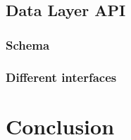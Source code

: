 \subsection{Data Layer API}
\subsubsection{Schema}
\subsubsection{Different interfaces}

\newpage
\setcounter{secnumdepth}{0} %
\section{Conclusion}
\lipsum[2]
